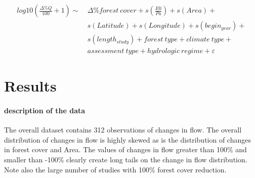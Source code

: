 \documentclass[]{elsarticle} %
\newenvironment{Shaded}{\begin{snugshade}}{\end{snugshade}}
\newcommand{\DataTypeTok}[1]{\textcolor[rgb]{0.13,0.29,0.53}{#1}}
\newcommand{\DecValTok}[1]{\textcolor[rgb]{0.00,0.00,0.81}{#1}}
\newcommand{\KeywordTok}[1]{\textcolor[rgb]{0.13,0.29,0.53}{\textbf{#1}}}
\newcommand{\NormalTok}[1]{#1}
\newcommand{\OperatorTok}[1]{\textcolor[rgb]{0.81,0.36,0.00}{\textbf{#1}}}
\newcommand{\StringTok}[1]{\textcolor[rgb]{0.31,0.60,0.02}{#1}}
\begin{document}
\[\tag{6}
\begin{aligned}
log10(\frac{\Delta \% Q}{100} + 1) \sim ~&\Delta \% forest~cover +
s(\frac{E0}{Pa}) + s(Area) + \\ 
& s(Latitude) + s(Longitude) + s(begin_{year}) + \\ 
& s(length_{study}) + {forest~type} + {climate~type} + \\ 
& {assessment~type} + {hydrologic~regime} + \varepsilon
\end{aligned}\]

\hypertarget{results}{%
\section{Results}\label{results}}

\hypertarget{description-of-the-data}{%
\paragraph{description of the data}\label{description-of-the-data}}

The overall dataset contains 312 observations of changes in flow. The
overall distribution of changes in flow is highly skewed as is the
distribution of changes in forest cover and Area. The values of changes
in flow greater than 100\% and smaller than -100\% clearly create long
tails on the change in flow distribution. Note also the large number of
studies with 100\% forest cover reduction.

\begin{Shaded}
\end{Shaded}
\end{document}
